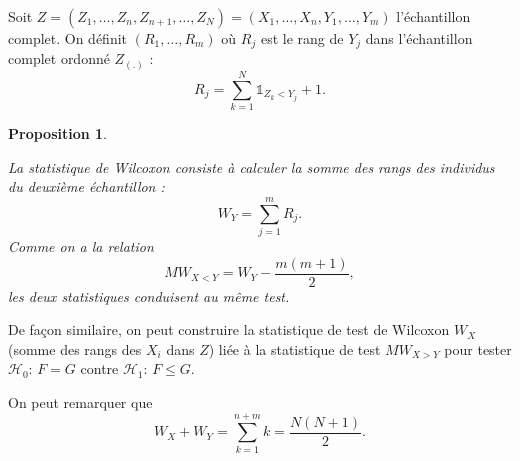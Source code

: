 \documentclass[
]{book}
\newtheorem{proposition}{Proposition}[chapter]
\theoremstyle{definition}
\theoremstyle{definition}
\theoremstyle{definition}
\theoremstyle{definition}
\theoremstyle{remark}
\begin{document}
Soit \(Z = (Z_1, \ldots, Z_n,Z_{n+1}, \ldots, Z_N)=(X_1, \ldots,X_n,Y_1,\ldots, Y_m)\) l'échantillon complet. On définit \((R_1,\ldots,R_m)\) où \(R_j\) est le rang de \(Y_j\) dans l'échantillon complet ordonné \(Z_{(.)}\) :
\[ R_j=\sum_{k=1}^N \mathbb{1}_{Z_k < Y_j}+1.\]

\begin{proposition}
\protect\hypertarget{prp:unlabeled-div-33}{}\label{prp:unlabeled-div-33}

La statistique de Wilcoxon consiste à calculer la somme des rangs des individus du deuxième échantillon :
\[W_{Y}=\sum_{j=1}^m R_j.\]
Comme on a la relation
\[MW_{X<Y}=  W_{Y} - \frac{m(m+1)}{2},\]
les deux statistiques conduisent au même test.

\end{proposition}

De façon similaire, on peut construire la statistique de test de Wilcoxon \(W_{X}\) (somme des rangs des \(X_i\) dans \(Z\)) liée à la statistique de test \(MW_{X>Y}\) pour tester \(\mathcal{H}_0\): \(F=G\) contre \(\mathcal{H}_1\): \(F \leq G\).

On peut remarquer que
\[
W_X + W_Y = \sum_{k=1}^{n+m} k = \frac{N (N+1)}{2}. 
\]
\end{document}
